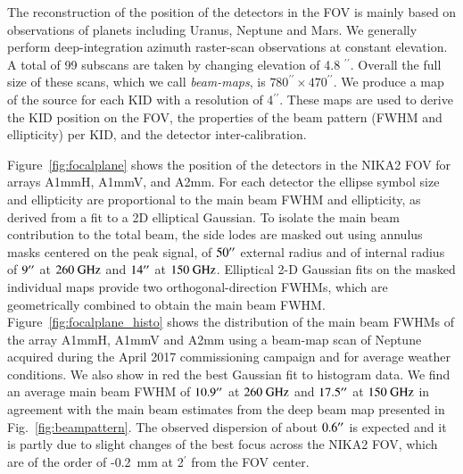 \documentclass[]{aa} %
\begin{document}
The reconstruction of the position of the detectors in the FOV is mainly based on observations of planets including Uranus, Neptune and Mars. We generally perform deep-integration azimuth raster-scan observations at constant elevation. A total of 99 subscans are taken by changing elevation of 4.8 $^{\prime \prime}$. Overall the full size of these scans, which we call {\it beam-maps}, is $780^{\prime \prime} \times 470^{\prime \prime}$. We produce a map of the source for each KID with a resolution of 4$^{\prime \prime}$. These maps are used to derive the KID position on the FOV, the properties of the beam pattern (FWHM and ellipticity) per KID, and the detector inter-calibration. 

Figure~\ref{fig:focalplane} shows the position of the detectors in the NIKA2 FOV for arrays A1mmH, A1mmV, and A2mm. For each detector the ellipse symbol size and ellipticity are proportional to the main beam FWHM and ellipticity, as derived from a fit to a 2D elliptical Gaussian. To isolate the main beam contribution to the total beam, the
side lodes are masked out using annulus masks centered on the peak signal, of $50\hbox{$^{\prime\prime}$}$ external radius and of internal radius of $9\hbox{$^{\prime\prime}$}$ at $260~\rm{GHz}$ and $14\hbox{$^{\prime\prime}$}$ at $150~\rm{GHz}$. Elliptical 2-D Gaussian fits on the masked individual maps provide two orthogonal-direction FWHMs, which are geometrically
combined to obtain the main beam FWHM. Figure~\ref{fig:focalplane_histo} shows the distribution of the main
beam FWHMs of the array A1mmH, A1mmV and A2mm using a beam-map scan of Neptune acquired during the April 2017 commissioning campaign and for average weather conditions. We also show in red the best Gaussian fit to histogram data. We find an average main beam FWHM of $10.9\hbox{$^{\prime\prime}$}$ at $260~\rm{GHz}$ and $17.5\hbox{$^{\prime\prime}$}$ at $150~\rm{GHz}$ in agreement with the main beam estimates from the deep beam map presented in Fig.~\ref{fig:beampattern}. The observed dispersion of about $0.6\hbox{$^{\prime\prime}$}$ is expected and it is partly due to slight changes of the best focus across the NIKA2 FOV, which are of the order of -0.2~\rm{mm} at 2$^{\prime}$ from the FOV center.
 
\end{document}
